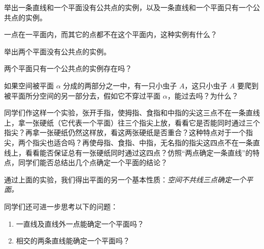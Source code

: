 \begin{Practice}
\begin{question}
	\item 举出一条直线和一个平面没有公共点的实例，以及一条直线和一个平面只有一个公共点的实例。
	\item 一点在一平面内，而其它的点都不在这个平面内，这种实例有什么？
	\item 举出两个平面没有公共点的实例。
	\item 两个平面只有一个公共点的实例存在吗？
	\item 如果空间被平面 $\alpha$ 分成的两部分之一中，有一只小虫子 $A$，这只小虫子 $A$ 要爬到	被平面所分空间的另一部分去，假如它不穿过平面 $\alpha$，能过去吗？为什么？
\end{question}
\end{Practice}

同学们作这样一个实验，张开手指，使拇指、食指和中指的尖这三点不在一条直线上，拿一张硬纸（它代表一个平面）往三个指尖上放，看看它是否能同时通过三个指尖？再拿一张硬纸仍然这样放，看这两张硬纸是否重合？这种特点对于一个指尖，两个指尖也适合吗？再使母指、食指、中指，无名指的指尖这四点不在一条直线上，看看能否保证总有一张硬纸同时通过这四点？仿照“两点确定一条直线”的特点，同学们能否总结出几个点确定一个平面的结论？

通过上面的实验，我们得出平面的另一个基本性质：\emph{空间不共线三点确定一个平面。}

同学们还可进一步思考以下的问题：
\begin{enumerate}
	\item 一直线及直线外一点能确定一个平面吗？
	\item 相交的两条直线能确定一个平面吗？
\end{enumerate}

